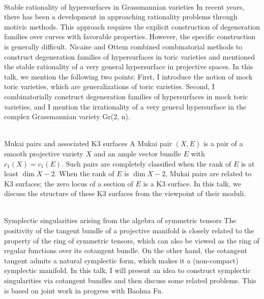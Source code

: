 \documentclass[dvipdfmx,a4paper,12pt]{article}
\theoremstyle{plain} %
\theoremstyle{definition} %
\begin{document}
\\
Stable rationality of hypersurfaces in Grassmannian varieties
\vskip3mm
In recent years, there has been a development in approaching rationality problems through motivic methods. This approach requires the explicit construction of degeneration families over curves with favorable properties. However, the specific construction is generally difficult. Nicaise and Ottem combined combinatorial methods to construct degeneration families of hypersurfaces in toric varieties and mentioned the stable rationality of a very general hypersurface in projective spaces. In this talk, we mention the following two points: First, I introduce the notion of mock toric varieties, which are generalizations of toric varieties. Second, I combinatorially construct degeneration families of hypersurfaces in mock toric varieties, and I mention the irrationality of a very general hypersurface in the complex Grassmannian variety Gr(2, n).
\vskip5mm


\vskip3mm

\\
Mukai pairs and associated K3 surfaces
\vskip3mm
A Mukai pair $(X,E)$ is a pair of a smooth projective variety $X$ and an ample vector bundle $E$ with $c_1(X)=c_1(E)$.
Such pairs are completely classified when the rank of $E$ is at least $\dim X -2$.
When the rank of $E$ is $\dim X -2$, Mukai pairs are related to K3 surfaces; the zero locus of a section of $E$ is a K3 surface.
In this talk, we discuss the structure of these K3 surfaces from the viewpoint of their moduli.
\vskip6mm

\\
Symplectic singularities arising from the algebra of symmetric tensors
\vskip3mm
The positivity of the tangent bundle of a projective manifold is closely related to the property of the ring of symmetric tensors, which can also be viewed as the ring of regular functions over its cotangent bundle. On the other hand, the cotangent tangent admits a natural symplectic form, which makes it a (non-compact) symplectic manifold. In this talk, I will present an idea to construct symplectic singularities via cotangent bundles and then discuss some related problems. This is based on joint work in progress with Baohua Fu.
\vskip6mm
\end{document}
